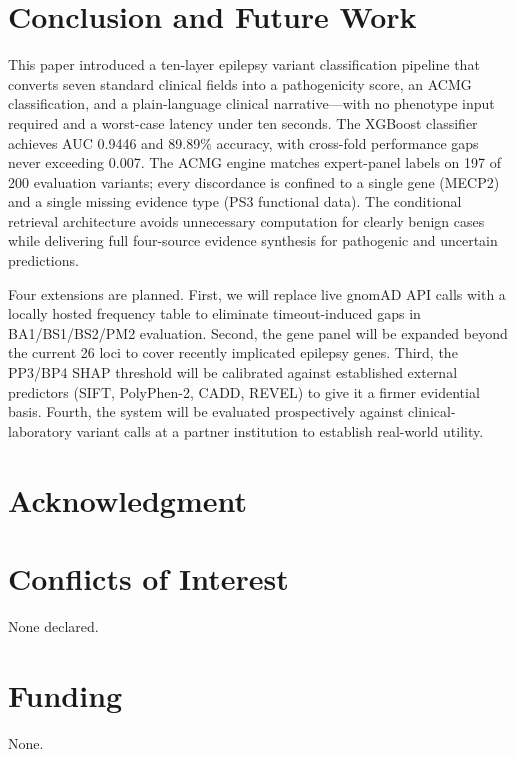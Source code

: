 \documentclass[12pt,a4paper]{article}
\begin{document}
\section{Conclusion and Future Work}

This paper introduced a ten-layer epilepsy variant classification
pipeline that converts seven standard clinical fields into a
pathogenicity score, an ACMG classification, and a plain-language
clinical narrative---with no phenotype input required and a
worst-case latency under ten seconds. The XGBoost classifier
achieves AUC 0.9446 and 89.89\% accuracy, with cross-fold
performance gaps never exceeding 0.007. The ACMG engine matches
expert-panel labels on 197 of 200 evaluation variants; every
discordance is confined to a single gene (MECP2) and a single
missing evidence type (PS3 functional data). The conditional
retrieval architecture avoids unnecessary computation for clearly
benign cases while delivering full four-source evidence synthesis
for pathogenic and uncertain predictions.

Four extensions are planned. First, we will replace live gnomAD
API calls with a locally hosted frequency table to eliminate
timeout-induced gaps in BA1/BS1/BS2/PM2 evaluation. Second, the
gene panel will be expanded beyond the current 26 loci to cover
recently implicated epilepsy genes. Third, the PP3/BP4 SHAP
threshold will be calibrated against established external
predictors (SIFT, PolyPhen-2, CADD, REVEL) to give it a firmer
evidential basis. Fourth, the system will be evaluated
prospectively against clinical-laboratory variant calls at a
partner institution to establish real-world utility.

\section*{Acknowledgment}

\section*{Conflicts of Interest}
None declared.

\section*{Funding}
None.
\end{document}
